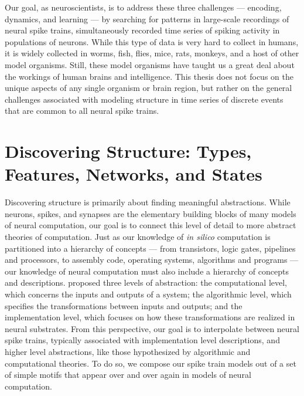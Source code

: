 Our goal, as neuroscientists, is to address these three challenges ---
encoding, dynamics, and learning --- by searching for patterns in
large-scale recordings of neural spike trains, simultaneously recorded
time series of spiking activity in populations of neurons. While this
type of data is very hard to collect in humans, it is widely collected
in worms, fish, flies, mice, rats, monkeys, and a host of other model
organisms.  Still, these model organisms have taught us a great deal
about the workings of human brains and intelligence.  This thesis does
not focus on the unique aspects of any single organism or brain
region, but rather on the general challenges associated with modeling
structure in time series of discrete events that are common to all
neural spike trains.


\section{Discovering Structure: Types, Features, Networks, and States}
Discovering structure is primarily about finding meaningful abstractions.  
While neurons, spikes, and
synapses are the elementary building blocks of many models of neural
computation, our goal is to connect this level of detail to more
abstract theories of computation.  Just as our knowledge of
\emph{in silico} computation is partitioned into a hierarchy of
concepts --- from transistors, logic gates, pipelines and processors,
to assembly code, operating systems, algorithms and programs --- our
knowledge of neural computation must also include a hierarchy of
concepts and descriptions.  \citet{marr1982vision} proposed three
levels of abstraction: the computational level, which concerns the inputs
and outputs of a system; the algorithmic level, which specifies the
transformations between inputs and outputs; and the implementation
level, which focuses on how these transformations are realized in
neural substrates.  From this perspective, our goal is to interpolate
between neural spike trains, typically associated with implementation
level descriptions, and higher level abstractions, like those
hypothesized by algorithmic and computational theories. To do so,
we compose our spike train models out of a set of simple
motifs that appear over and over again in models of
neural computation. 

